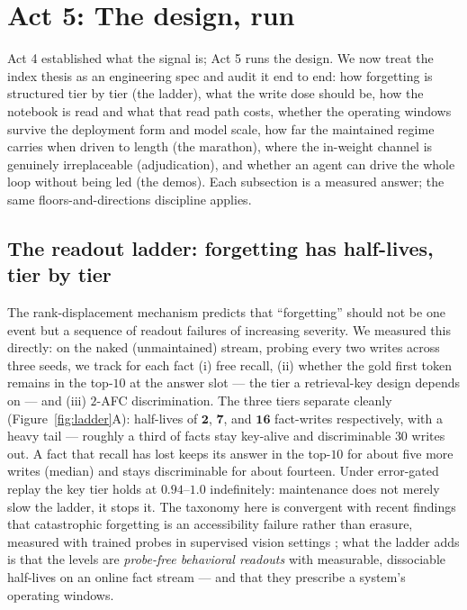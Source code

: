 \documentclass[11pt]{article}
\begin{document}
\section{Act 5: The design, run}\label{sec:act5}

Act 4 established what the signal is; Act 5 runs the design. We now treat the index thesis as
an engineering spec and audit it end to end: how forgetting is structured tier by tier (the
ladder), what the write dose should be, how the notebook is read and what that read path costs,
whether the operating windows survive the deployment form and model scale, how far the
maintained regime carries when driven to length (the marathon), where the in-weight channel is
genuinely irreplaceable (adjudication), and whether an agent can drive the whole loop without
being led (the demos). Each subsection is a measured answer; the same floors-and-directions
discipline applies.

\subsection{The readout ladder: forgetting has half-lives, tier by tier}\label{sec:ladder}

The rank-displacement mechanism predicts that ``forgetting'' should not be one event but a
sequence of readout failures of increasing severity. We measured this directly: on the naked
(unmaintained) stream, probing every two writes across three seeds, we track for each fact
(i) free recall, (ii) whether the gold first token remains in the top-$10$ at the answer slot
--- the tier a retrieval-key design depends on --- and (iii) $2$-AFC discrimination. The three
tiers separate cleanly (Figure~\ref{fig:ladder}A): half-lives of $\mathbf{2}$, $\mathbf{7}$,
and $\mathbf{16}$ fact-writes respectively, with a heavy tail --- roughly a third of facts stay
key-alive and discriminable $30$ writes out. A fact that recall has lost keeps its answer in
the top-$10$ for about five more writes (median) and stays discriminable for about fourteen.
Under error-gated replay the key tier holds at $0.94$--$1.0$ indefinitely: maintenance does not
merely slow the ladder, it stops it. The taxonomy here is convergent with recent findings that
catastrophic forgetting is an accessibility failure rather than erasure, measured with trained
probes in supervised vision settings \citep{accessibility2026}; what the ladder adds is that the
levels are \emph{probe-free behavioral readouts} with measurable, dissociable half-lives on an
online fact stream --- and that they prescribe a system's operating windows.
\end{document}
